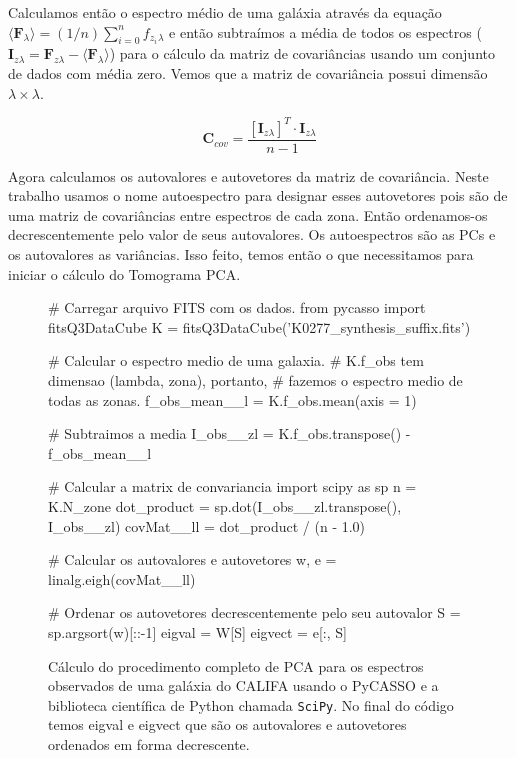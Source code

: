 Calculamos então o espectro médio de uma galáxia através da equação $\langle
\textbf{F}{}_\lambda \rangle = (1 / n) \sum_{i=0}^{n} f_{z_i}{}_{\lambda}$ e
então subtraímos a média de todos os espectros ($\textbf{I}{}_{z \lambda} =
\textbf{F}{}_{z \lambda} - \langle \textbf{F}{}_\lambda \rangle$) para o cálculo
da matriz de covariâncias usando um conjunto de dados com média zero. Vemos que
a matriz de covariância possui dimensão $\lambda \times \lambda$. 

\begin{equation}
	\label{eq:PCA:covMatrix}
	\mathbf{C}{}_{cov} = \frac{[\mathbf{I}{}_{z \lambda}]^T \cdot \mathbf{I}{}_{z
	\lambda}}{n - 1}
\end{equation}

Agora calculamos os autovalores e autovetores da matriz de covariância. Neste
trabalho usamos o nome autoespectro para designar esses autovetores pois são de
uma matriz de covariâncias entre espectros de cada zona. Então ordenamos-os
decrescentemente pelo valor de seus autovalores. Os autoespectros são as PCs e
os autovalores as variâncias. Isso feito, temos então o que necessitamos para
iniciar o cálculo do Tomograma PCA.

\begin{figure}
\begin{python}
# Carregar arquivo FITS com os dados.
from pycasso import fitsQ3DataCube
K = fitsQ3DataCube('K0277_synthesis_suffix.fits')

# Calcular o espectro medio de uma galaxia. 
# K.f_obs tem dimensao (lambda, zona), portanto, 
# fazemos o espectro medio de todas as zonas.
f_obs_mean__l = K.f_obs.mean(axis = 1)

# Subtraimos a media
I_obs__zl = K.f_obs.transpose() - f_obs_mean__l

# Calcular a matrix de convariancia
import scipy as sp
n = K.N_zone
dot_product = sp.dot(I_obs__zl.transpose(), I_obs__zl)
covMat__ll = dot_product / (n - 1.0)   

# Calcular os autovalores e autovetores
w, e = linalg.eigh(covMat__ll)

# Ordenar os autovetores decrescentemente pelo seu autovalor
S = sp.argsort(w)[::-1]
eigval = W[S]
eigvect = e[:, S]
 
\end{python}
	\caption[Exemplo de cálculo de PCA usando o PyCASSO e SciPy] {Cálculo do
	procedimento completo de PCA para os espectros observados de uma galáxia do
	CALIFA usando o PyCASSO e a biblioteca científica de Python chamada
	\texttt{SciPy}. No final do código temos eigval e eigvect que são os
	autovalores e autovetores ordenados em forma decrescente.}
	\label{fig:PCA:covMatrix}
\end{figure}

